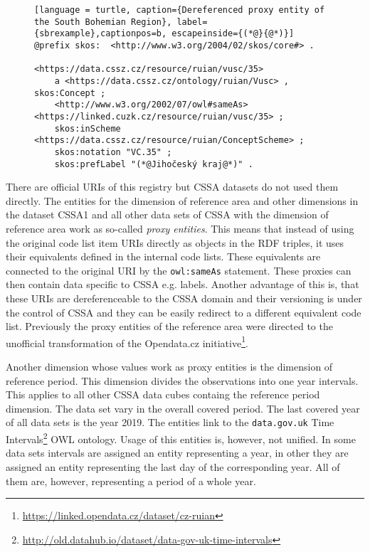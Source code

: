 
\begin{figure}[h]
\begin{lstlisting}[language = turtle, caption={Dereferenced proxy entity of the South Bohemian Region}, label={sbrexample},captionpos=b, escapeinside={(*@}{@*)}]
@prefix skos:  <http://www.w3.org/2004/02/skos/core#> .

<https://data.cssz.cz/resource/ruian/vusc/35>
    a <https://data.cssz.cz/ontology/ruian/Vusc> , skos:Concept ;
    <http://www.w3.org/2002/07/owl#sameAs> <https://linked.cuzk.cz/resource/ruian/vusc/35> ;
    skos:inScheme  <https://data.cssz.cz/resource/ruian/ConceptScheme> ;
    skos:notation "VC.35" ;
    skos:prefLabel "(*@Jihočeský kraj@*)" .
\end{lstlisting}
\end{figure}

There are official URIs of this registry but CSSA datasets do not used them directly. The entities for the dimension of reference area and other dimensions in the dataset CSSA1 and all other data sets of CSSA with the dimension of reference area work as so-called \textit{proxy entities}. This means that instead of using the original code list item URIs directly as objects in the RDF triples,  it uses their equivalents defined in the internal code lists. These equivalents are connected to the original URI by the \verb|owl:sameAs| statement. These proxies can then contain data specific to CSSA e.g. labels. Another advantage of this is, that these URIs are dereferenceable to the CSSA domain and their versioning is under the control of CSSA and they can be easily redirect to a different equivalent code list. Previously the proxy entities of the reference area were directed to the unofficial transformation of the Opendata.cz initiative\footnote{\href{https://linked.opendata.cz/dataset/cz-ruian}{https://linked.opendata.cz/dataset/cz-ruian}}.

Another dimension whose values work as proxy entities is the dimension of reference period. This dimension divides the observations into one year intervals. This applies to all other CSSA data cubes containg the reference period dimension. The data set vary in the overall covered period. The last covered year of all data sets is the year 2019. The entities link to the \verb|data.gov.uk| Time Intervals\footnote{\href{http://old.datahub.io/dataset/data-gov-uk-time-intervals}{http://old.datahub.io/dataset/data-gov-uk-time-intervals}} OWL ontology. Usage of this entities is, however, not unified. In some data sets intervals are assigned an entity representing a year, in other they are assigned an entity representing the last day of the corresponding year. All of them are, however, representing a period of a whole year.

